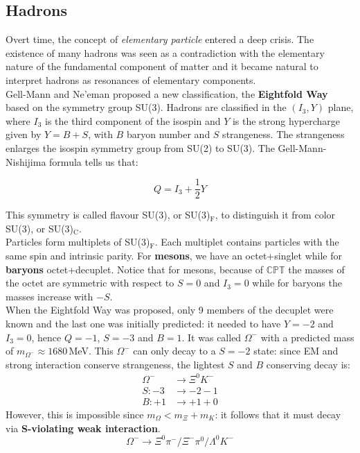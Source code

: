 \documentclass[10.75pt,a4paper,openright,bottom=2cm]{article}
\begin{document}
\subsection{Hadrons}
Overt time, the concept of \textit{elementary particle} entered a deep crisis. The existence of many hadrons was seen as a contradiction with the elementary nature of the fundamental component of matter and it became natural to interpret hadrons as resonances of elementary components.\\
Gell-Mann and Ne'eman proposed a new classification, the \textbf{Eightfold Way} based on the symmetry group SU(3). Hadrons are classified in the $(I_3,Y)$ plane, where $I_3$ is the third component of the isospin and $Y$ is the strong hypercharge given by $Y=B+S$, with $B$ baryon number and $S$ strangeness. The strangeness enlarges the isospin symmetry group from SU(2) to SU(3). The Gell-Mann-Nishijima formula tells us that:
\begin{tcolorbox}[width=\textwidth,colback={yellow!50},title={Gell-Mann-Nishijima Formula},colbacktitle={gray!50},coltitle=black]
\[
Q=I_3+\frac{1}{2}Y
\]
\end{tcolorbox}
\noindent
This symmetry is called flavour SU(3), or SU(3)$_\text{F}$, to distinguish it from color SU(3), or SU(3)$_\text{C}$.\\
Particles form multiplets of SU(3)$_\text{F}$. Each multiplet contains particles with the same spin and intrinsic parity. For \textbf{mesons}, we have an octet+singlet while for \textbf{baryons} octet+decuplet. Notice that for mesons, because of $\mathbb{CPT}$ the masses of the octet are symmetric with respect to $S=0$ and $I_3=0$ while for baryons the masses increase with $-S$.\\
When the Eightfold Way was proposed, only 9 members of the decuplet were known and the last one was initially predicted: it needed to have $Y=-2$ and $I_3=0$, hence $Q=-1$, $S=-3$ and $B=1$. It was called $\Omega^-$ with a predicted mass of $m_{\Omega^-}\approx1680$\,MeV. This $\Omega^-$ can only decay to a $S=-2$ state: since EM and strong interaction conserve strangeness, the lightest $S$ and $B$ conserving decay is:
\begin{align*}
\Omega^-&\to\Xi^0K^-\\
S:-3&\to-2-1\\
B:+1&\to+1+0
\end{align*}
However, this is impossible since $m_\Omega<m_\Xi+m_K$: it follows that it must decay via \textbf{S-violating weak interaction}.
\[
\Omega^-\to\Xi^0\pi^-/\Xi^-\pi^0/\Lambda^0K^-
\]
\end{document}
